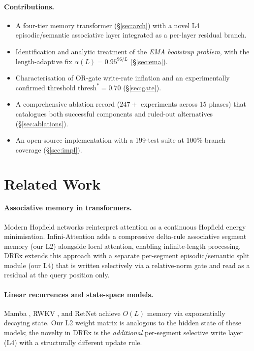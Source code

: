 \documentclass{article}
\begin{document}
\paragraph{Contributions.}
\begin{itemize}
  \item A four-tier memory transformer (\S\ref{sec:arch}) with a novel L4
        episodic/semantic associative layer integrated as a per-layer residual branch.
  \item Identification and analytic treatment of the \emph{EMA bootstrap problem}, with
        the length-adaptive fix $\alpha(L) = 0.95^{96/L}$
        (\S\ref{sec:ema}).
  \item Characterisation of OR-gate write-rate inflation and an experimentally confirmed
        threshold $\mathrm{thresh}^*=0.70$ (\S\ref{sec:gate}).
  \item A comprehensive ablation record  ($247+$ experiments across 15 phases) that
        catalogues both successful components and ruled-out alternatives
        (\S\ref{sec:ablations}).
  \item An open-source implementation with a 199-test suite at 100\% branch coverage
        (\S\ref{sec:impl}).
\end{itemize}

\section{Related Work}
\label{sec:related}

\paragraph{Associative memory in transformers.}
Modern Hopfield networks \citep{ramsauer2021hopfield} reinterpret attention as a
continuous Hopfield energy minimisation.  Infini-Attention \citep{munkhdalai2024infini}
adds a compressive delta-rule associative segment memory (our L2) alongside local
attention, enabling infinite-length processing.  DREx extends this approach with a
separate per-segment episodic/semantic split module (our L4) that is written
selectively via a relative-norm gate and read as a residual at the query position only.

\paragraph{Linear recurrences and state-space models.}
Mamba \citep{gu2024mamba}, RWKV \citep{peng2023rwkv}, and RetNet
\citep{sun2023retnet} achieve $O(L)$ memory via exponentially decaying state.  Our L2
weight matrix is analogous to the hidden state of these models; the novelty in DREx is
the \emph{additional} per-segment selective write layer (L4) with a structurally
different update rule.
\end{document}
